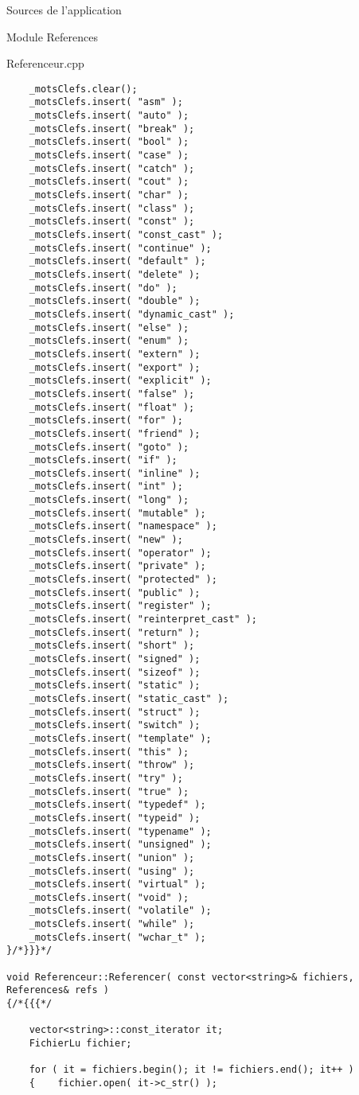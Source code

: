 \documentclass{article}
\begin{document}
\begin{section}{Sources de l'application}
\begin{subsection}{Module References}
\begin{paragraph}{Referenceur.cpp}
\begin{verbatim}
    _motsClefs.clear();
    _motsClefs.insert( "asm" );
    _motsClefs.insert( "auto" );
    _motsClefs.insert( "break" );
    _motsClefs.insert( "bool" );
    _motsClefs.insert( "case" );
    _motsClefs.insert( "catch" );
    _motsClefs.insert( "cout" );
    _motsClefs.insert( "char" );
    _motsClefs.insert( "class" );
    _motsClefs.insert( "const" );
    _motsClefs.insert( "const_cast" );
    _motsClefs.insert( "continue" );
    _motsClefs.insert( "default" );
    _motsClefs.insert( "delete" );
    _motsClefs.insert( "do" );
    _motsClefs.insert( "double" );
    _motsClefs.insert( "dynamic_cast" );
    _motsClefs.insert( "else" );
    _motsClefs.insert( "enum" );
    _motsClefs.insert( "extern" );
    _motsClefs.insert( "export" );
    _motsClefs.insert( "explicit" );
    _motsClefs.insert( "false" );
    _motsClefs.insert( "float" );
    _motsClefs.insert( "for" );
    _motsClefs.insert( "friend" );
    _motsClefs.insert( "goto" );
    _motsClefs.insert( "if" );
    _motsClefs.insert( "inline" );
    _motsClefs.insert( "int" );
    _motsClefs.insert( "long" );
    _motsClefs.insert( "mutable" );
    _motsClefs.insert( "namespace" );
    _motsClefs.insert( "new" );
    _motsClefs.insert( "operator" );
    _motsClefs.insert( "private" );
    _motsClefs.insert( "protected" );
    _motsClefs.insert( "public" );
    _motsClefs.insert( "register" );
    _motsClefs.insert( "reinterpret_cast" );
    _motsClefs.insert( "return" );
    _motsClefs.insert( "short" );
    _motsClefs.insert( "signed" );
    _motsClefs.insert( "sizeof" );
    _motsClefs.insert( "static" );
    _motsClefs.insert( "static_cast" );
    _motsClefs.insert( "struct" );
    _motsClefs.insert( "switch" );
    _motsClefs.insert( "template" );
    _motsClefs.insert( "this" );
    _motsClefs.insert( "throw" );
    _motsClefs.insert( "try" );
    _motsClefs.insert( "true" );
    _motsClefs.insert( "typedef" );
    _motsClefs.insert( "typeid" );
    _motsClefs.insert( "typename" );
    _motsClefs.insert( "unsigned" );
    _motsClefs.insert( "union" );
    _motsClefs.insert( "using" );
    _motsClefs.insert( "virtual" );
    _motsClefs.insert( "void" );
    _motsClefs.insert( "volatile" );
    _motsClefs.insert( "while" );
    _motsClefs.insert( "wchar_t" );
}/*}}}*/

void Referenceur::Referencer( const vector<string>& fichiers, References& refs )
{/*{{{*/

    vector<string>::const_iterator it;
    FichierLu fichier;

    for ( it = fichiers.begin(); it != fichiers.end(); it++ ) 
    {    fichier.open( it->c_str() );


\end{verbatim}
\end{paragraph}
\end{subsection}
\end{section}
\end{document}
